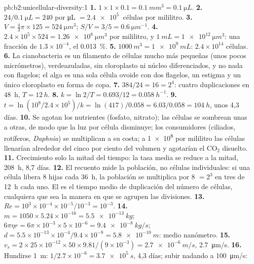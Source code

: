 \begin{solution}{pb:b2:unicellular-diversity:1}
\textbf{1.} $1\times 1\times 0.1 = \qty{0.1}{mm^3} = \qty{0.1}{\micro L}$.
\textbf{2.} $24/\qty{0.1}{\micro L} = 240$ por \unit{\micro L} $=
\qty{2.4e5}{}$ células por mililitro.
\textbf{3.} $V = \tfrac{4}{3}\pi\times 125 = \qty{524}{\micro m^3}$;
$S/V = 3/5 = \qty{0.6}{\micro m^{-1}}$.
\textbf{4.} $2.4\times 10^5\times 524 = \qty{1.26e8}{\micro m^3}$ por
mililitro, y $\qty{1}{mL} = \qty{1e12}{\micro m^3}$: una fracción de
$1.3\times 10^{-4}$, el \qty{0.013}{\%}.
\textbf{5.} $\qty{1000}{m^3} = \qty{1e9}{mL}$: $2.4\times 10^{14}$
células.
\textbf{6.} La cianobacteria es un filamento de células mucho más
pequeñas (unos pocos micrómetros), verdeazuladas, sin cloroplasto ni
núcleo diferenciados, y no nada con flagelos; el alga es una sola célula
ovoide con dos flagelos, un estigma y un único cloroplasto en forma de
copa.
\textbf{7.} $384/24 = 16 = 2^4$: cuatro duplicaciones en \qty{48}{h},
$T = \qty{12}{h}$.
\textbf{8.} $k = \ln 2/T = 0.693/12 = \qty{0.058}{h^{-1}}$.
\textbf{9.} $t = \ln(10^8/2.4\times 10^5)/k = \ln(417)/0.058 =
6.03/0.058 = \qty{104}{h}$, unos 4,3 días.
\textbf{10.} Se agotan los nutrientes (fosfato, nitrato); las células se
sombrean unas a otras, de modo que la luz por célula disminuye; los
consumidores (ciliados, rotíferos, \emph{Daphnia}) se multiplican a su
costa; a \qty{1e8}{} por mililitro las células llenarían alrededor del
cinco por ciento del volumen y agotarían el $\mathrm{CO_2}$
disuelto.
\textbf{11.} Crecimiento solo la mitad del tiempo: la tasa media se
reduce a la mitad, \qty{208}{h}, 8,7 días.
\textbf{12.} El recuento mide la población, no células individuales: si
una célula libera 8 hijas cada \qty{36}{h}, la población se multiplica
por 8 $= 2^3$ en tres  de \qty{12}{h} cada uno. El
 es el tiempo medio de duplicación del número de
células, cualquiera que sea la manera en que se agrupen las divisiones.
\textbf{13.} $Re = 10^3\times 10^{-4}\times 10^{-5}/10^{-3} = 10^{-3}$.
\textbf{14.} $m = 1050\times 5.24\times 10^{-16} = \qty{5.5e-13}{kg}$;
$6\pi\eta r = 6\pi\times 10^{-3}\times 5\times 10^{-6} =
\qty{9.4e-8}{kg/s}$; $d = 5.5\times 10^{-13}\times 10^{-4}/9.4\times
10^{-8} = \qty{5.8e-10}{m}$: medio nanómetro.
\textbf{15.} $v_s = 2\times 25\times 10^{-12}\times 50\times
9.81/(9\times 10^{-3}) = \qty{2.7e-6}{m/s}$, \qty{2.7}{\micro m/s}.
\textbf{16.} Hundirse \qty{1}{m}: $1/2.7\times 10^{-6} =
\qty{3.7e5}{s}$, 4,3 días; subir nadando a \qty{100}{\micro m/s}:

\end{solution}
